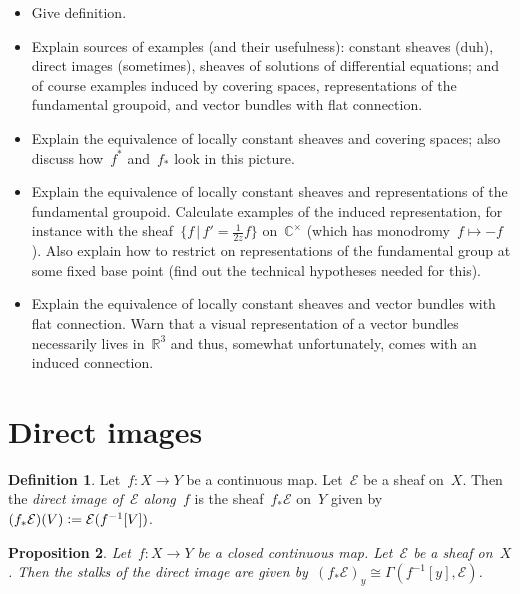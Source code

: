 \documentclass[10pt]{amsart}
\theoremstyle{definition}
\newtheorem{defn}{Definition}[section]
\theoremstyle{plain}
\newtheorem{prop}[defn]{Proposition}
\theoremstyle{remark}
\newcommand{\E}{\mathcal{E}}
\newcommand{\defeq}{\vcentcolon=}
\begin{document}
\begin{itemize}
\item Give definition.
\item Explain sources of examples (and their usefulness): constant sheaves
(duh), direct images (sometimes), sheaves of solutions of differential
equations; and of course examples induced by covering spaces, representations
of the fundamental groupoid, and vector bundles with flat connection.
\item Explain the equivalence of locally constant sheaves and covering spaces;
also discuss how~$f^*$ and~$f_*$ look in this picture.
\item Explain the equivalence of locally constant sheaves and representations
of the fundamental groupoid. Calculate examples of the induced representation,
for instance with the sheaf~$\{ f \,|\, f' = \frac{1}{2z} f \}$
on~$\mathbb{C}^\times$ (which has monodromy~$f \mapsto -f$). Also explain how
to restrict on representations of the fundamental group at some fixed base
point (find out the technical hypotheses needed for this).
\item Explain the equivalence of locally constant sheaves and vector bundles
with flat connection. Warn that a visual representation of a vector bundles
necessarily lives in~$\mathbb{R}^3$ and thus, somewhat unfortunately, comes
with an induced connection.
\end{itemize}


\section{Direct images}

\begin{defn}Let~$f : X \to Y$ be a continuous map. Let~$\E$ be a sheaf on~$X$.
Then the \emph{direct image of~$\E$ along~$f$} is the sheaf~$f_*\E$ on~$Y$
given by~$(f_*\E)(V) \defeq \E(f^{-1}[V])$.\end{defn}

\begin{prop}Let~$f : X \to Y$ be a closed continuous map. Let~$\E$ be a sheaf
on~$X$. Then the stalks of the direct image are given by~$(f_*\E)_y \cong
\Gamma(f^{-1}[y], \E)$.\end{prop}
\end{document}

